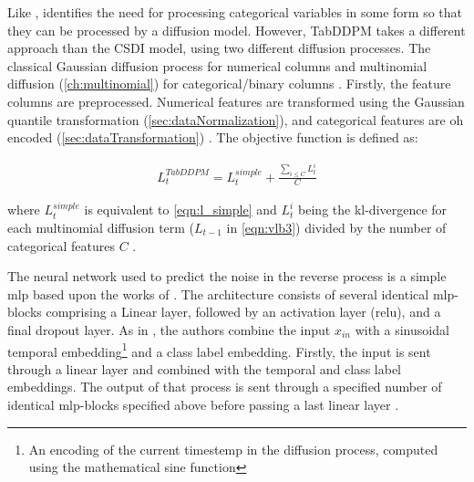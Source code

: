 Like \textcite{zheng2022DiffusionModelsMissing}, \textcite{kotelnikov2022TabDDPMModellingTabular} identifies the need for processing categorical variables in some form so that they can be processed by a diffusion model.
However, TabDDPM takes a different approach than the CSDI model, using two different diffusion processes.
The classical Gaussian diffusion process \cite{ho2020DenoisingDiffusionProbabilistic} for numerical columns and multinomial diffusion \cite{hoogeboom2021ArgmaxFlowsMultinomial} (\autoref{ch:multinomial}) for categorical/binary columns \cite{zheng2022DiffusionModelsMissing}.
Firstly, the feature columns are preprocessed.
Numerical features are transformed using the Gaussian quantile transformation (\autoref{sec:dataNormalization}), and categorical features are \gls{oh} encoded (\autoref{sec:dataTransformation}) \cite{kotelnikov2022TabDDPMModellingTabular}.
The objective function is defined as:

\begin{equation}
    \label{eqn:tabddpm_loss}
    \begin{align*}
        L^{TabDDPM}_{t} =L^{simple}_t + \frac{\sum_{i \leq C}^{}L^i_{t}}{C}
    \end{align*}
\end{equation}

where $L^{simple}_t$ is equivalent to \autoref{eqn:l_simple} and $L^i_{t}$ being the \gls{kl}-divergence for each multinomial diffusion term ($L_{t-1}$ in \autoref{eqn:vlb3}) divided by the number of categorical features $C$ \cite{kotelnikov2022TabDDPMModellingTabular}.

The neural network used to predict the noise in the reverse process is a simple \gls{mlp} based upon the works of \cite{gorishniy2021RevisitingDeepLearning}.
The architecture consists of several identical \gls{mlp}-blocks comprising a Linear layer, followed by an activation layer (\gls{relu}), and a final dropout layer. 
As in \cite{nichol2021ImprovedDenoisingDiffusion, dhariwal2021DiffusionModelsBeat}, the authors combine the input $x_{in}$ with a sinusoidal temporal embedding\footnote{An encoding of the current timestemp in the diffusion process, computed using the mathematical sine function} and a class label embedding.
Firstly, the input is sent through a linear layer and combined with the temporal and class label embeddings.
The output of that process is sent through a specified number of identical \gls{mlp}-blocks specified above before passing a last linear layer \cite{kotelnikov2022TabDDPMModellingTabular}.

